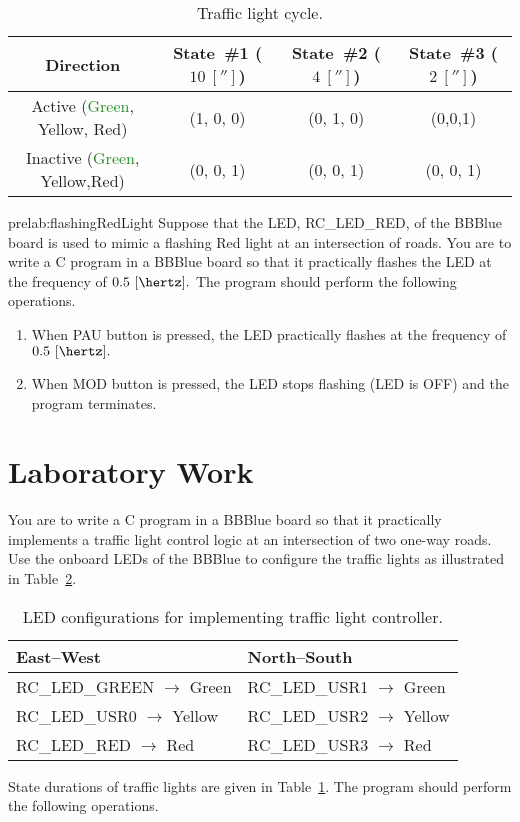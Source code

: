 \begin{table}%
\caption{Traffic light cycle.}
\label{tab:traffic1}
\centering
\begin{tabular}{c|c|c|c}
\toprule
Direction & State~\#1 ($10~[\second]$) & State~\#2 ($4~[\second]$) & State~\#3 ($2~[\second]$)\\
\toprule
Active (\textcolor{ForestGreen}{Green}, \textcolor{YellowOrange}{Yellow}, \textcolor{BrickRed}{Red}) & (1, 0, 0) & (0, 1, 0) & (0,0,1)\\
\hline
Inactive (\textcolor{ForestGreen}{Green}, \textcolor{YellowOrange}{Yellow},\textcolor{BrickRed}{Red}) & (0, 0, 1) & (0, 0, 1) & (0, 0, 1)\\
\bottomrule
\end{tabular}

\end{table}


\begin{prelab}{prelab:flashingRedLight}
  Suppose that the LED, RC\_LED\_RED, of the BBBlue board is used  to mimic a flashing Red light at an intersection of roads. You are to write a C program in a BBBlue board so that it practically flashes the LED at the frequency of $0.5~[\hertz].$ The program should perform the  following operations.
  \begin{enumerate}
  \item When PAU button is pressed, the LED practically flashes at the frequency of $0.5~[\hertz].$
  \item When MOD button is pressed, the LED stops flashing (LED is OFF) and the program terminates.      
  \end{enumerate}
\end{prelab}




\section{Laboratory Work}

You are to write a C program in a BBBlue board so that it practically implements a traffic light control logic at an intersection of  two one-way roads. Use the onboard LEDs of the BBBlue to configure the traffic lights as illustrated in Table~\ref{tab:tlc2}. %
%
\begin{table}
  \centering
  \caption{LED configurations for implementing traffic light controller. }
  \label{tab:tlc2}  
  \begin{tabular}{l|l}
    \toprule   
    East--West & North--South\\
    \toprule
    RC\_LED\_GREEN $\to$ Green & RC\_LED\_USR1 $\to$ Green\\   	    
    RC\_LED\_USR0 $\to$ Yellow  	  & RC\_LED\_USR2 $\to$ Yellow\\  
    RC\_LED\_RED 	$\to$ Red          & RC\_LED\_USR3 $\to$ Red\\  
    \bottomrule    
  \end{tabular}
\end{table}
%
State durations of traffic lights are given in  Table~\ref{tab:traffic1}. The program should perform the  following operations.


